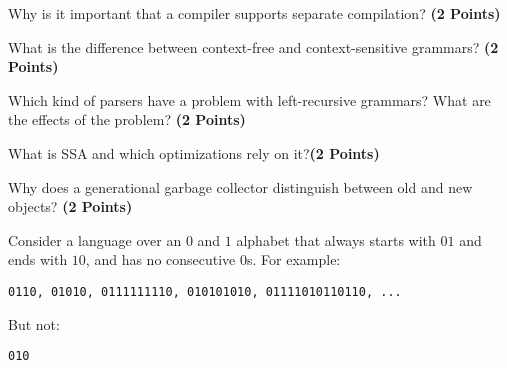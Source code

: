 \documentclass [11pt, a4wide, twoside]{article}
\begin{document}
\begin{myenumerate}

\item Why is it important that a compiler supports separate compilation? \textbf{(2 Points)}
\vspace{3cm}

\item What is the difference between context-free and context-sensitive grammars? \textbf{(2 Points)}
\vspace{3cm}

\item Which kind of parsers have a problem with left-recursive grammars? What are the effects of the problem? \textbf{(2 Points)}
\solution{}\vspace{3cm}

\item What is SSA and which optimizations rely on it?\textbf{(2 Points)}
\vspace{3cm}

\item Why does a generational garbage collector distinguish between old and new objects? \textbf{(2 Points)}
\vspace{3cm}

\newpage


\end{myenumerate}

\noindent
%
Consider a language over an $0$ and $1$ alphabet that always starts with $01$ and ends with $10$, and has no consecutive $0$s. For example:
\begin{verbatim}
0110, 01010, 0111111110, 010101010, 01111010110110, ...
\end{verbatim}
But not:
\begin{verbatim}
010
\end{verbatim}
\end{document}
